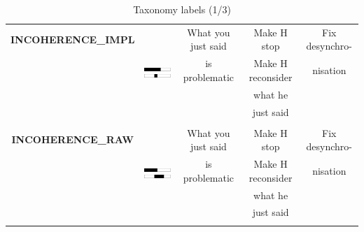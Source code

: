 \begin{table}[htp]
{\begin{tabular}{|c|c|c|c|c|}
				& & & & \\
               	\hline
               	\rule{0pt}{4ex}
          		\textbf{INCOHERENCE\_IMPL} & \multirow{5}{*}{\includegraphics[scale=0.5]{figures/TTPProfiles/implBargeIn.pdf}} & What you just said & \tabitem Make H stop & \tabitem Fix desynchro- \\
             	& & is problematic & \tabitem Make H reconsider & nisation \\
            	& & & what he & \\
               	& & & just said & \\
				& & & & \\
               	\hline
              	\rule{0pt}{4ex}
              	\textbf{INCOHERENCE\_RAW} & \multirow{5}{*}{\includegraphics[scale=0.5]{figures/TTPProfiles/shortBargeIn.pdf}} & What you just said & \tabitem Make H stop & \tabitem Fix desynchro- \\
          		& & is problematic & \tabitem Make H reconsider & nisation \\
        		& & & what he & \\
            	& & & just said & \\
				& & & & \\
               	\hline
        	\end{tabular}
		}
        \caption{Taxonomy labels (1/3)}
        \label{tab:taxosynth}
  	\end{table}

